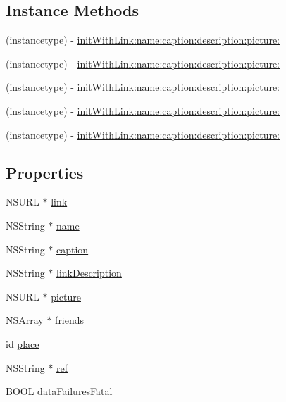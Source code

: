 \subsection*{Instance Methods}
\begin{DoxyCompactItemize}
\item 
(instancetype) -\/ \hyperlink{interfaceFBLinkShareParams_a6c9c0dddf0644517ce50aa6204dea8c5}{init\+With\+Link\+:name\+:caption\+:description\+:picture\+:}
\item 
(instancetype) -\/ \hyperlink{interfaceFBLinkShareParams_a6c9c0dddf0644517ce50aa6204dea8c5}{init\+With\+Link\+:name\+:caption\+:description\+:picture\+:}
\item 
(instancetype) -\/ \hyperlink{interfaceFBLinkShareParams_a6c9c0dddf0644517ce50aa6204dea8c5}{init\+With\+Link\+:name\+:caption\+:description\+:picture\+:}
\item 
(instancetype) -\/ \hyperlink{interfaceFBLinkShareParams_a6c9c0dddf0644517ce50aa6204dea8c5}{init\+With\+Link\+:name\+:caption\+:description\+:picture\+:}
\item 
(instancetype) -\/ \hyperlink{interfaceFBLinkShareParams_a6c9c0dddf0644517ce50aa6204dea8c5}{init\+With\+Link\+:name\+:caption\+:description\+:picture\+:}
\end{DoxyCompactItemize}
\subsection*{Properties}
\begin{DoxyCompactItemize}
\item 
N\+S\+U\+RL $\ast$ \hyperlink{interfaceFBLinkShareParams_a7ff0ca2dda179d8896019690319e549f}{link}
\item 
N\+S\+String $\ast$ \hyperlink{interfaceFBLinkShareParams_af78b3775a4744710602664bb19e792b4}{name}
\item 
N\+S\+String $\ast$ \hyperlink{interfaceFBLinkShareParams_a77249c8ccfa716be398a735481e20f07}{caption}
\item 
N\+S\+String $\ast$ \hyperlink{interfaceFBLinkShareParams_a0998847c522a5336663181eafe80b0dc}{link\+Description}
\item 
N\+S\+U\+RL $\ast$ \hyperlink{interfaceFBLinkShareParams_a5b3fc50595d7e789b1abdcf0b499d88c}{picture}
\item 
N\+S\+Array $\ast$ \hyperlink{interfaceFBLinkShareParams_a3545525c9ac4d4159b874b1b044ad95f}{friends}
\item 
id \hyperlink{interfaceFBLinkShareParams_af541ef9ee605422b1d8f658078564f8e}{place}
\item 
N\+S\+String $\ast$ \hyperlink{interfaceFBLinkShareParams_ad46be56767edc2c1dca8e7d16bfda278}{ref}
\item 
B\+O\+OL \hyperlink{interfaceFBLinkShareParams_a50f69fd3710c6bef38a886f4af47c654}{data\+Failures\+Fatal}
\end{DoxyCompactItemize}


